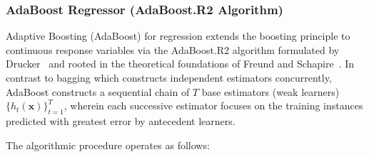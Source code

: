 \documentclass[12pt,a4paper]{article}
\begin{document}
\subsubsection{AdaBoost Regressor (AdaBoost.R2 Algorithm)}
Adaptive Boosting (AdaBoost) for regression extends the boosting principle to continuous response variables via the AdaBoost.R2 algorithm formulated by Drucker~\cite{drucker1997} and rooted in the theoretical foundations of Freund and Schapire~\cite{freund1997}. In contrast to bagging which constructs independent estimators concurrently, AdaBoost constructs a sequential chain of $T$ base estimators (weak learners) $\{h_t(\mathbf{x})\}_{t=1}^T$, wherein each successive estimator focuses on the training instances predicted with greatest error by antecedent learners.

The algorithmic procedure operates as follows:
\end{document}
